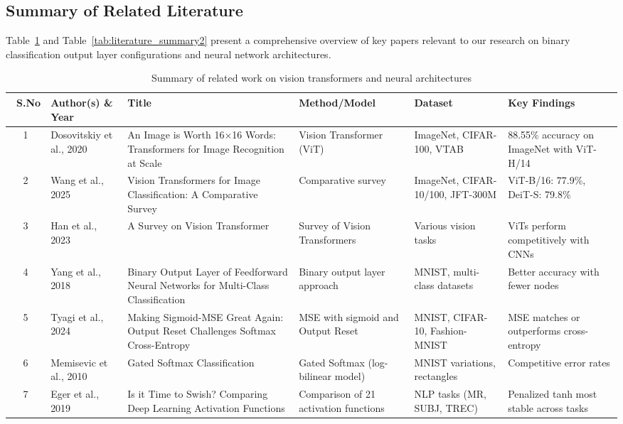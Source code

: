\subsection{Summary of Related Literature}

Table~\ref{tab:literature_summary1} and Table~\ref{tab:literature_summary2} present a comprehensive overview of key papers relevant to our research on binary classification output layer configurations and neural network architectures.

\begin{table}[htbp]
\scriptsize
\centering
\caption{Summary of related work on vision transformers and neural architectures}
\label{tab:literature_summary1}
\begin{tabular}{|c|p{1.8cm}|p{2.5cm}|p{2.5cm}|p{2.2cm}|p{2.5cm}|}
\hline
\textbf{\ S.No} & \textbf{Author(s) \& Year} & \textbf{Title} & \textbf{Method/Model} & \textbf{Dataset} & \textbf{Key Findings} \\ 
\hline
1 & Dosovitskiy et al., 2020 & An Image is Worth 16×16 Words: Transformers for Image Recognition at Scale & Vision Transformer (ViT) & ImageNet, CIFAR-100, VTAB & 88.55\% accuracy on ImageNet with ViT-H/14 \\ 
\hline
2 & Wang et al., 2025 & Vision Transformers for Image Classification: A Comparative Survey & Comparative survey & ImageNet, CIFAR-10/100, JFT-300M & ViT-B/16: 77.9\%, DeiT-S: 79.8\% \\ 
\hline
3 & Han et al., 2023 & A Survey on Vision Transformer & Survey of Vision Transformers & Various vision tasks & ViTs perform competitively with CNNs \\ 
\hline
4 & Yang et al., 2018 & Binary Output Layer of Feedforward Neural Networks for Multi-Class Classification & Binary output layer approach & MNIST, multi-class datasets & Better accuracy with fewer nodes \\ 
\hline
5 & Tyagi et al., 2024 & Making Sigmoid-MSE Great Again: Output Reset Challenges Softmax Cross-Entropy & MSE with sigmoid and Output Reset & MNIST, CIFAR-10, Fashion-MNIST & MSE matches or outperforms cross-entropy \\ 
\hline
6 & Memisevic et al., 2010 & Gated Softmax Classification & Gated Softmax (log-bilinear model) & MNIST variations, rectangles & Competitive error rates \\ 
\hline
7 & Eger et al., 2019 & Is it Time to Swish? Comparing Deep Learning Activation Functions & Comparison of 21 activation functions & NLP tasks (MR, SUBJ, TREC) & Penalized tanh most stable across tasks \\ 

\end{tabular}
\end{table}
